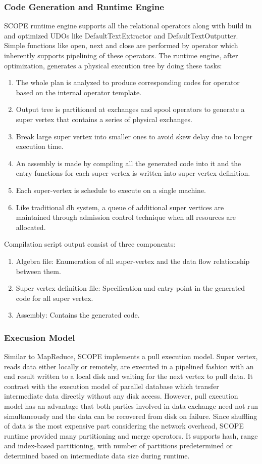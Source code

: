 \documentclass[runningheads,a4paper]{llncs}
\begin{document}
{\subsubsection{Code Generation and Runtime Engine}
SCOPE runtime engine supports all the relational operators along with build in and optimized UDOs like DefaultTextExtractor and DefaultTextOutputter. Simple functions like open, next and close are performed by operator which inherently supports pipelining of these operators.  The runtime engine, after optimization, generates a physical execution tree by doing these tasks:
\begin{enumerate}
	\item The whole plan is analyzed to produce corresponding codes for operator based on the internal operator template.
	\item  Output tree is partitioned at exchanges and spool operators to generate a super vertex that contains a series of physical exchanges.
	\item Break large super vertex into smaller ones to avoid skew delay due to longer execution time.
	\item An assembly is made by compiling all the generated code into it and the entry functions for each super vertex is written into super vertex definition.
	\item Each super-vertex is schedule to execute on a single machine.
	\item Like traditional db system, a queue of additional super vertices are maintained through admission control technique when all resources are allocated.
\end{enumerate}

Compilation script output consist of three components:
\begin{enumerate}
	\item Algebra file: Enumeration of all super-vertex and the data flow relationship between them.
	\item Super vertex definition file: Specification and entry point in the generated code for all super vertex.
	\item Assembly: Contains the generated code.
\end{enumerate}

\subsubsection{Execusion Model}
Similar to MapReduce, SCOPE implements a pull execution model. Super vertex, reads data either locally or remotely, are executed in a pipelined fashion with an end result written to a local disk and waiting for the next vertex to pull data. It contrast with the execution model of parallel database which transfer intermediate data directly without any disk access. However, pull execution model has an advantage that both parties involved in data exchange need not run simultaneously and the data can be recovered from disk on failure. Since shuffling of data is the most expensive part considering the network overhead, SCOPE runtime provided many partitioning and merge operators.  It supports hash, range and index-based partitioning, with number of partitions predetermined or determined based on intermediate data size during runtime.


}
\end{document}
